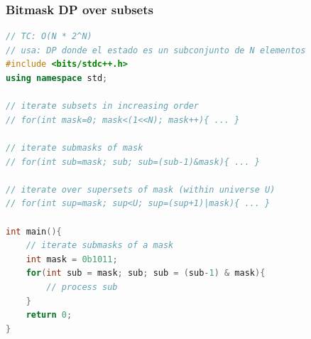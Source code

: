 \subsubsection{Bitmask DP over subsets}
\begin{lstlisting}[style=mystyle, language=C++]
// TC: O(N * 2^N)
// usa: DP donde el estado es un subconjunto de N elementos
#include <bits/stdc++.h>
using namespace std;

// iterate subsets in increasing order
// for(int mask=0; mask<(1<<N); mask++){ ... }

// iterate submasks of mask
// for(int sub=mask; sub; sub=(sub-1)&mask){ ... }

// iterate over supersets of mask (within universe U)
// for(int sup=mask; sup<U; sup=(sup+1)|mask){ ... }

int main(){
	// iterate submasks of a mask
	int mask = 0b1011;
	for(int sub = mask; sub; sub = (sub-1) & mask){
		// process sub
	}
	return 0;
}
\end{lstlisting}
